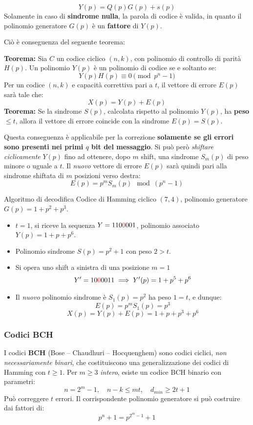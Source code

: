 $$Y(p)= Q(p)G(p)+s(p)$$
Solamente in caso di \textbf{sindrome nulla}, la parola di codice è valida, in quanto il polinomio generatore $G(p)$ è un \textbf{fattore} di $Y(p)$.

Ciò è conseguenza del seguente teorema:

\textbf{Teorema:} Sia $C$ un codice ciclico $(n,k)$, con polinomio di controllo di parità $H(p)$. Un polinomio $Y(p)$ è un polinomio di codice se e soltanto se:
\[Y(p)H(p) \equiv 0 \pmod{p^n-1}\]
Per un codice $(n,k)$ e capacità correttiva pari a $t$, il vettore di errore $E(p)$ sarà tale che:
$$X(p)= Y(p)+E(p)$$
\textbf{Teorema:} Se la sindrome $S(p)$, calcolata rispetto al polinomio $Y(p)$, ha \textbf{peso} $\leq t$, allora il vettore di errore coincide con la sindrome $E(p) = S(p)$.

Questa conseguenza è applicabile per la correzione \textbf{solamente se gli errori sono presenti nei primi $q$ bit del messaggio}. Si può però \textit{shiftare ciclicamente} $Y(p)$ fino ad ottenere, dopo $m$ shift, una sindrome $S_m(p)$ di peso minore o uguale a $t$.
Il \textit{nuovo} vettore di errore $E(p)$ sarà quindi pari alla sindrome shiftata di $m$ posizioni verso destra:
$$E(p)=p^mS_m(p)\mod(p^n-1)$$

\begin{esempio}{Algoritmo di decodifica}
    Codice di Hamming ciclico $(7,4)$, polinomio generatore $G(p)= 1 + p^2 +p^3$.
    \begin{itemize}
        \item $t=1$, si riceve la sequenza $Y=110\textcolor{red}{0}001$, polinomio associato $Y(p)= 1+p+p^6$.
        \item Polinomio sindrome $S(p)=p^2+1$ con peso $2>t$.
        \item Si opera uno shift a sinistra di una posizione $m=1$
        $$Y'= 10\textcolor{red}{0}0011 \implies Y'(p)= 1+p^5+p^6$$
        \item Il \textit{nuovo} polinomio sindrome è $S_1(p)=p^2$ ha peso $1=t$, e dunque:
        $$E(p)= p^mS_1(p)=p^3$$
        $$X(p)=Y(p)+E(p)= 1 + p +p^3+p^6$$
    \end{itemize}
\end{esempio}

\subsubsection{Codici BCH}
I codici \textbf{BCH} (Bose – Chaudhuri – Hocquenghem) sono codici ciclici, \textit{non necessariamente binari}, che costituiscono una generalizzazione dei codici di Hamming con $t \geq 1$.
Per $m \geq 3$ \textit{intero}, esiste un codice BCH binario con parametri:
\[ n=2^m-1, \quad n-k \leq mt, \quad d_{min} \geq 2t+1 \]
Può correggere $t$ errori.
Il corrispondente polinomio generatore si può costruire dai fattori di:
\[ p^n + 1 = p^{2^m-1} + 1 \]

